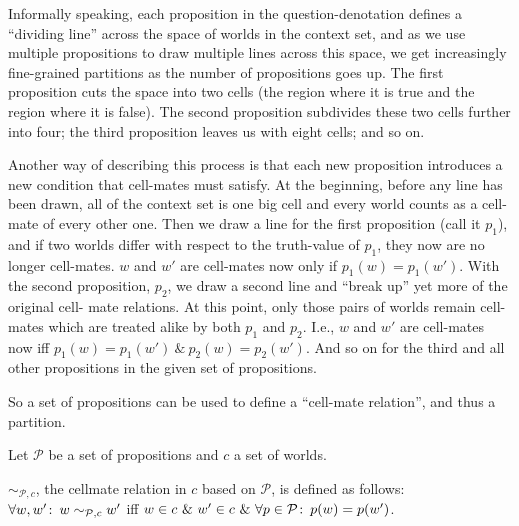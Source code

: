 Informally speaking, each proposition in the question-denotation defines a
``dividing line'' across the space of worlds in the context set, and as we use
multiple propositions to draw multiple lines across this space, we get
increasingly fine-grained partitions as the number of propositions goes up. %
%
The first proposition cuts the space into two cells (the region where it is true
and the region where it is false). The second proposition subdivides these two
cells further into four; the third proposition leaves us with eight cells; and
so on.

Another way of describing this process is that each new proposition introduces a
new condition that cell-mates must satisfy. At the beginning, before any line
has been drawn, all of the context set is one big cell and every world counts as
a cell-mate of every other one. Then we draw a line for the first proposition
(call it $p_{1}$), and if two worlds differ with respect to the truth-value of
$p_{1}$, they now are no longer cell-mates. $w$ and $w'$ are cell-mates now only
if $p_{1}(w) = p_{1}(w')$. With the second proposition, $p_{2}$, we draw a
second line and ``break up'' yet more of the original cell- mate relations. At
this point, only those pairs of worlds remain cell-mates which are treated alike
by both $p_{1}$ and $p_{2}$. I.e., $w$ and $w'$ are cell-mates now iff
$p_{1}(w) = p_{1}(w')\ \&\ p_{2}(w) = p_{2}(w')$. And so on for the third and
all other propositions in the given set of propositions.

So a set of propositions can be used to define a ``cell-mate relation'', and
thus a partition.

\pex Let $\mathcal{P}$ be a set of propositions and $c$ a set of worlds.%
\label{ex:cellmate-partition}

\a $\sim_{\mathcal{P},c}$, the cellmate relation in $c$ based on $\mathcal{P}$, is defined as
follows:\\
$\forall w,w'\co w \sim_{\mathcal{P},c} w'$ iff
$w\in c\ \&\ w'\in c\ \&\ \forall p\in \mathcal{P}\co p(w)=p(w')$.

